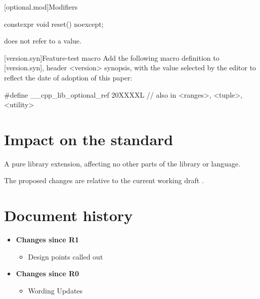 \documentclass[a4paper,10pt,oneside,openany,final,article]{memoir}
\begin{document}
\begin{wording}
  [optional.mod]{Modifiers}

  \begin{itemdecl}
    constexpr void reset() noexcept;
  \end{itemdecl}

  \begin{itemdescr}

    \pnum
    \ensures
     does not refer to a value.
  \end{itemdescr}

[version.syn]{Feature-test macro}
Add the following macro definition to [version.syn], header <version> synopsis, with the value selected by the editor to reflect the date of adoption of this paper:

\begin{codeblock}
  #define __cpp_lib_optional_ref 20XXXXL // also in <ranges>, <tuple>, <utility>
\end{codeblock}

\end{wording}

\chapter{Impact on the standard}

A pure library extension, affecting no other parts of the library or language.

The proposed changes are relative to the current working draft \cite{N4910}.

\chapter*{Document history}

\begin{itemize}
\item \textbf{Changes since R1}
  \begin{itemize}
  \item Design points called out
  \end{itemize}
\item \textbf{Changes since R0}
  \begin{itemize}
  \item Wording Updates
  \end{itemize}
\end{itemize}

\renewcommand{\bibname}{References}


\end{document}
